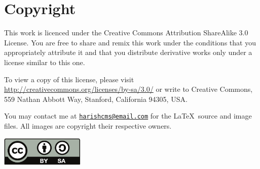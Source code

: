 \documentclass[a4paper]{article}
\begin{document}
\section*{Copyright}
This work is licenced under the Creative Commons Attribution 
ShareAlike 3.0 License. 
You are free to share and remix this work under the conditions that you 
appropriately attribute it and that you distribute derivative works 
only under a license similar to this one.

To view a copy of this license, please visit 
\url{http://creativecommons.org/licenses/by-sa/3.0/} or write to
Creative Commons, 559 Nathan Abbott Way, Stanford, California 94305, USA.

You may contact me at 
\href{mailto:harishcms@email.com}{\tt harishcms@email.com} 
for the \LaTeX\ source and image files.
All images are copyright their respective owners. 

\begin{center}
\includegraphics[width=0.3\textwidth]{images/cc_by_sa}
\end{center}
\end{document}
